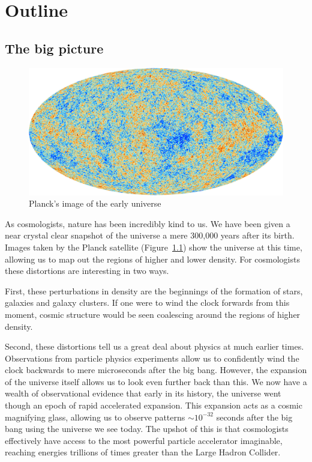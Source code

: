 \chapter{Outline}
\label{chap:out}

\section{The big picture}
\begin{figure}[tp]
  \includegraphics[width=\textwidth]{chapters/outline/figures/planck}
  \caption{Planck's image of the early universe}\label{fig:out:planck}
\end{figure}

As cosmologists, nature has been incredibly kind to us. We have been given a near crystal clear snapshot of the universe a mere 300,000 years after its birth. Images taken by the Planck satellite (Figure~\ref{fig:out:planck}) show the universe at this time, allowing us to map out the regions of higher and lower density. For cosmologists these distortions are interesting in two ways. 

First, these perturbations in density are the beginnings of the formation of stars, galaxies and galaxy clusters. If one were to wind the clock forwards from this moment, cosmic structure would be seen coalescing around the regions of higher density.

Second, these distortions tell us a great deal about physics at much earlier times. Observations from particle physics experiments allow us to confidently wind the clock backwards to mere microseconds after the big bang.
However, the expansion of the universe itself allows us to look even further back than this. We now have a wealth of observational evidence that early in its history, the universe went though an epoch of rapid accelerated expansion.  This expansion acts as a cosmic magnifying glass, allowing us to observe patterns $\sim10^{-32}$ seconds after the big bang using the universe we see today. The upshot of this is that cosmologists effectively have access to the most powerful particle accelerator imaginable, reaching energies trillions of times greater than the Large Hadron Collider. 

